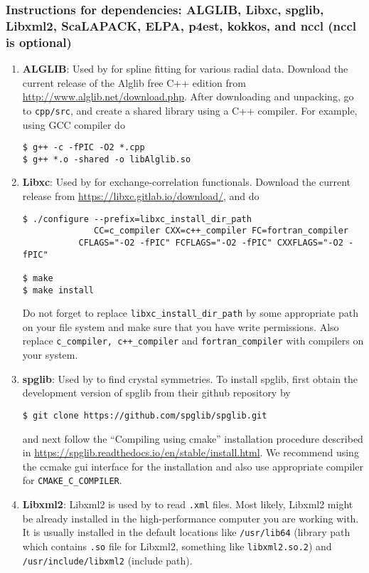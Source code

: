 \subsubsection{Instructions for dependencies: ALGLIB, Libxc, spglib, Libxml2, ScaLAPACK, ELPA, p4est, kokkos, and nccl (nccl is optional)}
\begin{enumerate}
	\item   {\bf ALGLIB}: Used by \dftfe{} for spline fitting for various radial data. Download the current release of the Alglib free C++ edition from \url{http://www.alglib.net/download.php}. After downloading and unpacking, go to \verb|cpp/src|, and create a shared library using a C++ compiler. For example, using GCC compiler do
\begin{verbatim}
$ g++ -c -fPIC -O2 *.cpp
$ g++ *.o -shared -o libAlglib.so
\end{verbatim}
\item {\bf Libxc}: Used by \dftfe{} for exchange-correlation functionals. Download the current release from \url{https://libxc.gitlab.io/download/}, and do 
\begin{verbatim}
$ ./configure --prefix=libxc_install_dir_path
              CC=c_compiler CXX=c++_compiler FC=fortran_compiler
	       CFLAGS="-O2 -fPIC" FCFLAGS="-O2 -fPIC" CXXFLAGS="-O2 -fPIC"
     
$ make
$ make install
\end{verbatim}
Do not forget to replace \verb|libxc_install_dir_path| by some appropriate path on your file system and make sure that you have write permissions. Also replace \verb|c_compiler, c++_compiler| and \verb|fortran_compiler| with compilers on your system.

\item {\bf spglib}: Used by \dftfe{} to find crystal symmetries. To install spglib, first obtain the development version of spglib from their github repository by
\begin{verbatim}
$ git clone https://github.com/spglib/spglib.git	
\end{verbatim}	
and next follow the ``Compiling using cmake'' installation procedure described in \url{https://spglib.readthedocs.io/en/stable/install.html}.   	
We recommend using the ccmake gui interface for the installation and also use appropriate compiler for \verb|CMAKE_C_COMPILER|.

\item {\bf Libxml2}: Libxml2 is used by \dftfe{} to read \verb|.xml| files. Most likely, Libxml2 might be already installed in the high-performance computer you are working with. It is usually installed in the default locations like \verb|/usr/lib64| (library path which contains \verb|.so| file for Libxml2, something like \verb|libxml2.so.2|) and \verb|/usr/include/libxml2| (include path). 


\end{enumerate}

